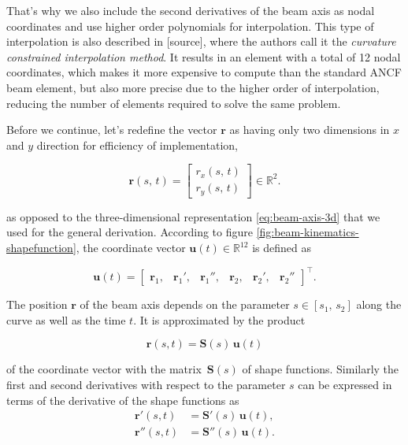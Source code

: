 That's why we also include the second derivatives of the beam axis as nodal coordinates and use higher order polynomials for interpolation.
This type of interpolation is also described in [source], where the authors call it the \textit{curvature constrained interpolation method}.
It results in an element with a total of 12 nodal coordinates, which makes it more expensive to compute than the standard ANCF beam element, but also more precise due to the higher order of interpolation, reducing the number of elements required to solve the same problem.

Before we continue, let's redefine the vector $\boldsymbol{r}$ as having only two dimensions in $x$ and $y$ direction for efficiency of implementation,

\begin{equation}
\boldsymbol{r}(s,\,t) = \begin{bmatrix}
r_x(s,\,t) \\
r_y(s,\,t)
\end{bmatrix} \in \mathbb{R}^2.\label{eq:beam-axis-2d}
\end{equation}

as opposed to the three-dimensional representation \ref{eq:beam-axis-3d} that we used for the general derivation.
According to figure \ref{fig:beam-kinematics-shapefunction}, the coordinate vector $\boldsymbol{u}(t) \in \mathbb{R}^{12}$ is defined as

\begin{equation}
\boldsymbol{u}(t) = \begin{bmatrix}
\boldsymbol{r}_{1}, & \boldsymbol{r}_{1}', & \boldsymbol{r}_{1}'', & \boldsymbol{r}_{2}, & \boldsymbol{r}_{2}', & \boldsymbol{r}_{2}''
\end{bmatrix}^\intercal.
\end{equation}

The position $\boldsymbol{r}$ of the beam axis depends on the parameter $s \in [s_{1},\,s_{2}]$ along the curve as well as the time $t$.
It is approximated by the product

\begin{equation}
\boldsymbol{r}(s, t) = \boldsymbol{S}(s)\,\boldsymbol{u}(t) \label{eq:ancf-position}
\end{equation}

of the coordinate vector with the matrix~$\boldsymbol{S}(s)$ of shape functions.
Similarly the first and second derivatives with respect to the parameter $s$ can be expressed in terms of the derivative of the shape functions as
%
\begin{align}
\boldsymbol{r}'(s, t) &= \boldsymbol{S}'(s)\,\boldsymbol{u}(t), \\
\boldsymbol{r}''(s, t) &= \boldsymbol{S}''(s)\,\boldsymbol{u}(t).
\end{align}

